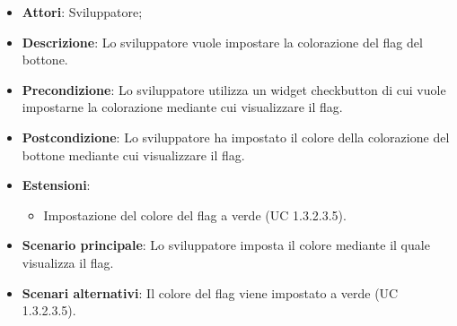 
\FloatBarrier
\begin{itemize}
\item\textbf{Attori}: Sviluppatore;
\item\textbf{Descrizione}: Lo sviluppatore vuole impostare la colorazione del flag del bottone.
\item\textbf{Precondizione}: Lo sviluppatore utilizza un widget checkbutton di cui vuole impostarne la colorazione mediante cui visualizzare il flag.
\item\textbf{Postcondizione}: Lo sviluppatore ha impostato il colore della colorazione del bottone mediante cui visualizzare il flag.
\item \textbf{Estensioni}: 
\begin{itemize}
\item Impostazione del colore del flag a verde (UC 1.3.2.3.5).
\end{itemize}
\item\textbf{Scenario principale}: Lo sviluppatore imposta il colore mediante il quale visualizza il flag.
\item\textbf{Scenari alternativi}: Il colore del flag viene impostato a verde (UC 1.3.2.3.5).
\end{itemize}